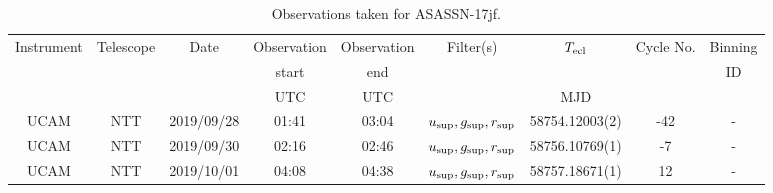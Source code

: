 \begin{table}
	\begin{center}
		\caption{Observations taken for ASASSN-17jf.}
		\label{table:observing:observation logs ASASSN-17jf}
		\begin{tabular}{ccccccccc}
			\hline
			Instrument & Telescope & Date & Observation  & Observation  & Filter(s) & $T_{\rm ecl}$ & Cycle No. & Binning \\
			 &  &  &  start &  end &  &  &  & ID \\
			 &  &  & UTC & UTC &  & MJD &  &  \\
			\hline
			\hline
			UCAM & NTT & 2019/09/28 & 01:41 & 03:04 & $u_{\rm sup},g_{\rm sup},r_{\rm sup}$ & 58754.12003(2) & -42 & - \\
			UCAM & NTT & 2019/09/30 & 02:16 & 02:46 & $u_{\rm sup},g_{\rm sup},r_{\rm sup}$ & 58756.10769(1) &  -7 & - \\
			UCAM & NTT & 2019/10/01 & 04:08 & 04:38 & $u_{\rm sup},g_{\rm sup},r_{\rm sup}$ & 58757.18671(1) &  12 & - \\
		   \hline
		\end{tabular}
	\end{center}
\end{table}